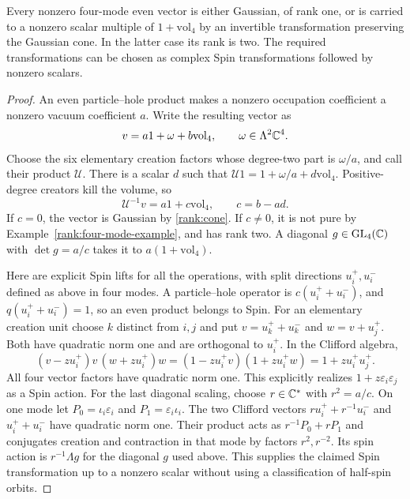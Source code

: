 \begin{lemma}\label{rank:four-mode-normal}
Every nonzero four-mode even vector is either Gaussian, of rank one, or
is carried to a nonzero scalar multiple of $1+\mathrm{vol}_4$ by an
invertible transformation preserving the Gaussian cone. In the latter
case its rank is two. The required transformations can be chosen as
complex Spin transformations followed by nonzero scalars.
\end{lemma}
\begin{proof}
An even particle--hole product makes a nonzero occupation coefficient a
nonzero vacuum coefficient $a$. Write the resulting vector as
\[
 v=a1+\omega+b\mathrm{vol}_4,
 \qquad \omega\in\Lambda^2\mathbb C^4.
\]
Choose the six elementary creation factors whose degree-two part is
$\omega/a$, and call their product $\mathcal U$.
There is a scalar $d$ such that
$\mathcal U1=1+\omega/a+d\mathrm{vol}_4$.
Positive-degree creators kill the volume, so
\[
 \mathcal U^{-1}v=a1+c\mathrm{vol}_4,\qquad c=b-ad.
\]
If $c=0$, the vector is Gaussian by \eqref{rank:cone}. If $c\ne0$, it is
not pure by Example~\ref{rank:four-mode-example}, and has rank two.
A diagonal $g\in\operatorname{GL}_4(\mathbb C)$ with $\det g=a/c$ takes it to
$a(1+\mathrm{vol}_4)$.

Here are explicit Spin lifts for all the operations, with split directions
$u_i^+,u_i^-$ defined as above in four modes. A particle--hole operator is
$c(u_i^++u_i^-)$, and $q(u_i^++u_i^-)=1$, so an even product belongs to
Spin. For an elementary creation unit choose $k$ distinct from $i,j$ and
put $v=u_k^++u_k^-$ and $w=v+u_j^+$. Both have quadratic norm one and
are orthogonal to $u_i^+$. In the Clifford algebra,
\[
 (v-zu_i^+)v\,(w+zu_i^+)w
 =(1-zu_i^+v)(1+zu_i^+w)=1+zu_i^+u_j^+.
\]
All four vector factors have quadratic norm one. This explicitly realizes
$1+z\varepsilon_i\varepsilon_j$ as a Spin action. For the last diagonal
scaling, choose $r\in\mathbb C^*$ with $r^2=a/c$. On one mode let
$P_0=\iota_i\varepsilon_i$ and $P_1=\varepsilon_i\iota_i$.
The two Clifford vectors $ru_i^++r^{-1}u_i^-$ and $u_i^++u_i^-$ have
quadratic norm one. Their product acts as $r^{-1}P_0+rP_1$ and
conjugates creation and contraction in that mode by factors
$r^2,r^{-2}$. Its spin action is $r^{-1}\Lambda g$ for the diagonal
$g$ used above. This supplies the claimed Spin transformation up to a
nonzero scalar without using a classification of half-spin orbits.
\end{proof}

